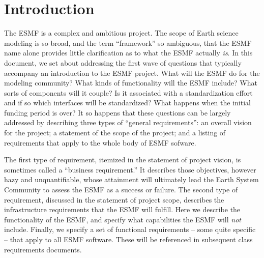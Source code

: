 \section{Introduction}

The ESMF is a complex and ambitious 
project.   The scope of Earth science modeling is so broad, and the 
term ``framework'' so ambiguous, that the ESMF name alone provides 
little clarification as to what the ESMF actually {\it is}.  In 
this document, we set about addressing the first wave of questions that 
typically accompany an introduction to the ESMF project.  What will the 
ESMF do for the modeling community?  What kinds of functionality will the ESMF 
include?  What sorts of components will it couple?  Is it associated with 
a standardization effort and if so which interfaces will be 
standardized?  What happens when the initial funding period is over?  
It so happens that these questions can be largely addressed by
describing three types of ``general requirements'': an overall vision 
for the project; a statement of the scope of the project; and a listing 
of requirements that apply to the whole body of ESMF sofware.

The first type of requirement, itemized in the statement of project vision,
is sometimes called a ``business requirement.'' \cite{wiegers}  It 
describes those objectives, however hazy and unquantifiable, whose 
attainment will ultimately lead the 
Earth System Community to assess the ESMF as a success or failure.  The second 
type of requirement, discussed in the statement of project scope, 
describes the infrastructure requirements that the ESMF will fulfill.  Here
we describe the functionality of the ESMF, and specify what capabilities 
the ESMF will {\it not} include.  Finally, we specify a set of functional 
requirements -- some quite specific -- that apply to all ESMF 
software.  These will be referenced in subsequent class requirements 
documents.





